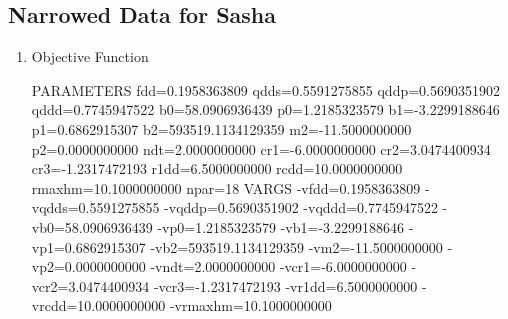 \documentclass[11pt]{article}
\begin{document}
\subsection{Narrowed Data for Sasha}
\label{sec:org4dc2576}


\begin{enumerate}
\item Objective Function
\label{sec:org61eccf8}


PARAMETERS
  fdd=0.1958363809 qdds=0.5591275855 qddp=0.5690351902 qddd=0.7745947522 b0=58.0906936439 p0=1.2185323579 b1=-3.2299188646 p1=0.6862915307 b2=593519.1134129359 m2=-11.5000000000 p2=0.0000000000 ndt=2.0000000000 cr1=-6.0000000000 cr2=3.0474400934 cr3=-1.2317472193 r1dd=6.5000000000 rcdd=10.0000000000 rmaxhm=10.1000000000 npar=18 
VARGS
    -vfdd=0.1958363809 -vqdds=0.5591275855 -vqddp=0.5690351902 -vqddd=0.7745947522 -vb0=58.0906936439 -vp0=1.2185323579 -vb1=-3.2299188646 -vp1=0.6862915307 -vb2=593519.1134129359 -vm2=-11.5000000000 -vp2=0.0000000000 -vndt=2.0000000000 -vcr1=-6.0000000000 -vcr2=3.0474400934 -vcr3=-1.2317472193 -vr1dd=6.5000000000 -vrcdd=10.0000000000 -vrmaxhm=10.1000000000 




\end{enumerate}
\end{document}
